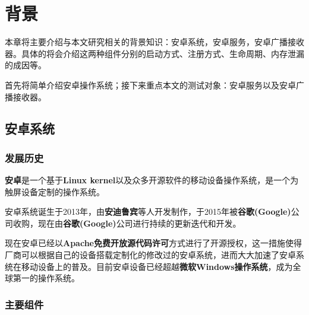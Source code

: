 \chapter{背景}\label{chapter_background}
本章将主要介绍与本文研究相关的背景知识：安卓系统，安卓服务，安卓广播接收器。具体的将会介绍这两种组件分别的启动方式、注册方式、生命周期、内存泄漏的成因等。

首先将简单介绍安卓操作系统；接下来重点本文的测试对象：安卓服务以及安卓广播接收器。

\section{安卓系统}
\subsection{发展历史}
\textbf{安卓}是一个基于\textbf{Linux kernel}以及众多开源软件的移动设备操作系统，是一个为触屏设备定制的操作系统。

安卓系统诞生于2013年，由\textbf{安迪鲁宾}等人开发制作，于2015年被\textbf{谷歌(Google)}公司收购，现在由\textbf{谷歌(Google)}公司进行持续的更新迭代和开发。

现在安卓已经以\textbf{Apache免费开放源代码许可}方式进行了开源授权，这一措施使得厂商可以根据自己的设备搭载定制化的修改过的安卓系统，进而大大加速了安卓系统在移动设备上的普及。目前安卓设备已经超越\textbf{微软Windows操作系统}，成为全球第一的操作系统。

\subsection{主要组件}

